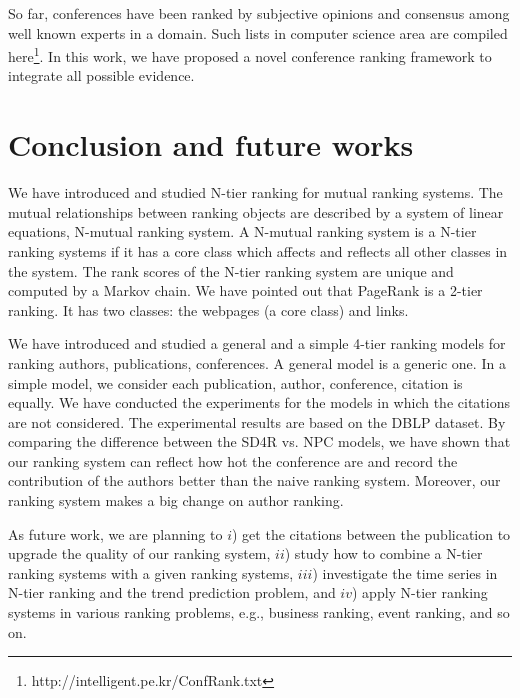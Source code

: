 \documentclass[lnicst]{svmultln}
\begin{document}
So far, conferences have been ranked by subjective opinions and consensus among well known experts in a domain. 
Such lists in computer science area are compiled here\footnote{http://intelligent.pe.kr/ConfRank.txt}.  
In this work, we have proposed a novel conference ranking framework to integrate all possible evidence.


\section{Conclusion and future works}\label{Sect:Conclusion}
We have introduced and studied N-tier ranking for mutual ranking systems. The mutual relationships between ranking objects are described by a system of linear equations, N-mutual ranking system. A N-mutual ranking system is a N-tier ranking systems if it has a core class which affects and reflects all other classes in the system. The rank scores of the N-tier ranking system are unique and computed by a Markov chain. We have pointed out that PageRank is a 2-tier ranking. It has two classes:  the webpages (a core class) and links.

We have introduced and studied a general and a simple 4-tier ranking models for ranking authors, publications, conferences. A general model is a generic one. In a simple model, we consider each publication, author, conference, citation is equally. We have conducted the experiments for the models in which the citations are not considered. The experimental results are based on the DBLP dataset. By comparing the difference between the SD4R vs. NPC models, we have shown that our ranking system can reflect how hot the conference are and record the contribution of the authors better than the naive ranking system. Moreover, our ranking system makes a big change on author ranking.

As future work, we are planning to $i$) get the citations between the publication to upgrade the quality of our ranking system, $ii$) study how to combine a N-tier ranking systems with a given ranking systems, $iii$) investigate the time series in N-tier ranking and the trend prediction problem, and $iv$) apply N-tier ranking systems in various ranking problems, e.g., business ranking, event ranking, and so on.   
\end{document}
